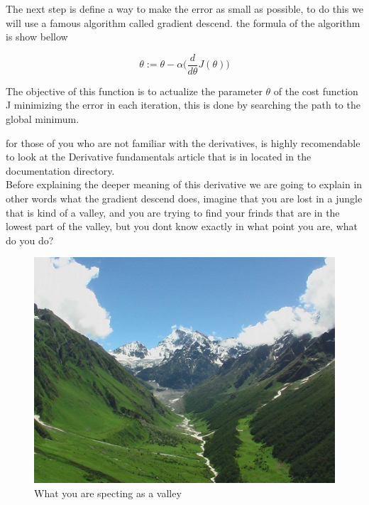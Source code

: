 \documentclass[12pt,journal]{IEEEtran}
\begin{document}
    The next step is define a way to make the error as small as possible,
    to do this we will use a famous algorithm called gradient descend.
    the formula of the algorithm is show bellow

    \begin{equation}
        \theta := \theta - \alpha
            \Bigg(
                \frac{d}{d \theta} J(\theta)
            \Bigg)
    \end{equation}

    The objective of this function is to actualize the parameter $\theta$
    of the cost function J minimizing the error in each iteration, this
    is done by searching the path to the global minimum.

    for those of you who are not familiar with the derivatives, is highly
    recomendable to look at the Derivative fundamentals article that is in
    located in the documentation directory.\\

    Before explaining the deeper meaning of this derivative we are going to
    explain in other words what the gradient descend does, imagine that you are
    lost in a jungle that is kind of a valley, and you are trying to find your
    frinds that are in the lowest part of the valley, but you dont know exactly
    in what point you are, what do you do?\\


    \vspace{2cm}

    \begin{figure}[h]
        \centering
        \includegraphics[scale=0.2]{Valley}
        \caption{What you are specting as a valley}
    \end{figure}
\end{document}
